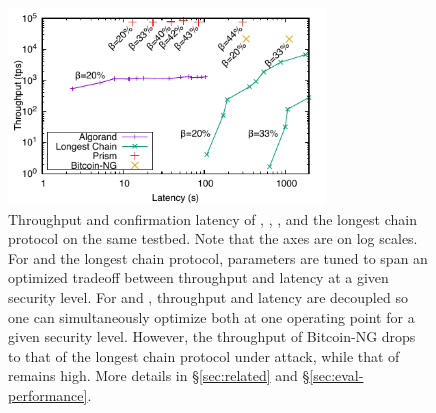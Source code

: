 \begin{figure} 
    \centering
    \includegraphics[width=0.75\textwidth]{figures/compare-fig.pdf}
    \caption[Throughput and confirmation latency of Prism, Algorand, Bitcoin-NG, and the longest chain protocol on the same testbed.]{Throughput and confirmation latency of \prism, \algorand, \bng, and the longest chain protocol on the same testbed. Note that the axes are on log scales. For \algorand and the longest chain protocol, parameters are tuned to span an optimized tradeoff between throughput and latency at a given security level. For \bng and \prism, throughput and latency are decoupled so one can simultaneously optimize both at one operating point for a given security level. However, the throughput of Bitcoin-NG drops to that of the longest chain protocol under attack, while that of \prism remains high. More details in \S\ref{sec:related} and \S\ref{sec:eval-performance}.}
    \label{fig:compare}
\end{figure}

